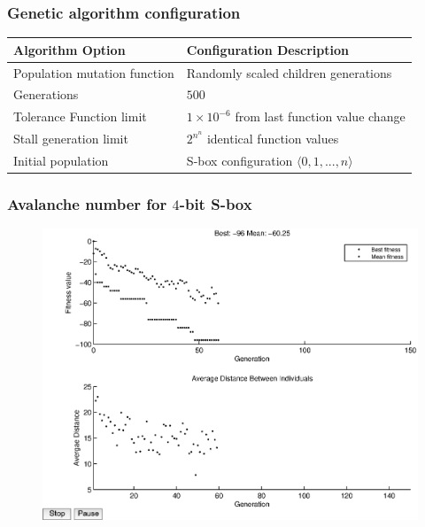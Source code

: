 \documentclass[handout]{beamer}
\begin{document}
\begin{frame}
	\frametitle{Genetic algorithm configuration}
\begin{table}
	\centering
    \begin{tabular}{|l|l|}
        \hline
        \textbf{Algorithm Option} & \textbf{Configuration Description} \\ \hline
        Population mutation function & Randomly scaled children generations \\ 
        Generations & $500$ \\ 
        Tolerance Function limit & $1 \times 10^{-6}$ from last function value change \\ 
        Stall generation limit & $2^{n^n}$ identical function values \\ 
        Initial population & S-box configuration $\langle 0, 1, ..., n \rangle$ \\
        \hline
    \end{tabular}
	\label{configTable}
\end{table}
\end{frame}

\begin{frame}
	\frametitle{Avalanche number for $4$-bit S-box}
\begin{figure}
\centering
	\includegraphics[scale=0.5]{images/avalanche_results16.eps}
\end{figure}
\end{frame}
\end{document}
